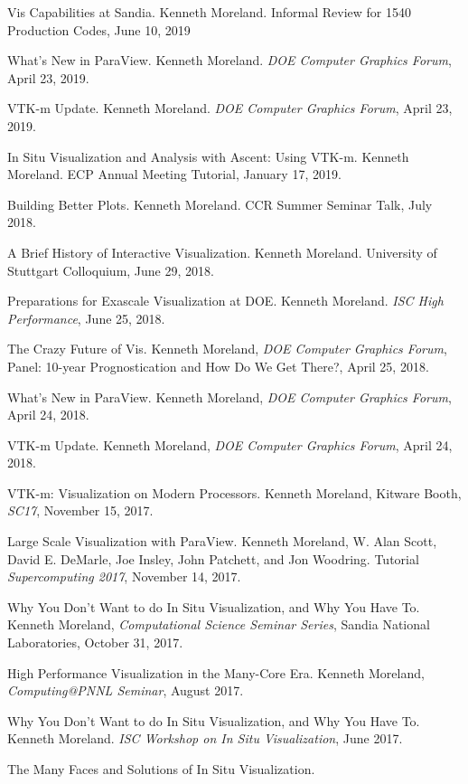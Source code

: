 \documentclass{article}
\begin{document}
\begin{enumerate}[label={[\arabic*]}]
\item Vis Capabilities at Sandia.
  Kenneth Moreland.
  Informal Review for 1540 Production Codes, June 10, 2019
\item What's New in ParaView.
  Kenneth Moreland.
  \emph{DOE Computer Graphics Forum}, April 23, 2019.
\item VTK-m Update.
  Kenneth Moreland.
  \emph{DOE Computer Graphics Forum}, April 23, 2019.
\item In Situ Visualization and Analysis with Ascent: Using VTK-m.
  Kenneth Moreland.
  ECP Annual Meeting Tutorial, January 17, 2019.
\item Building Better Plots.
  Kenneth Moreland.
  CCR Summer Seminar Talk, July 2018.
\item A Brief History of Interactive Visualization.
  Kenneth Moreland.
  University of Stuttgart Colloquium, June 29, 2018.
\item Preparations for Exascale Visualization at DOE.
  Kenneth Moreland.
  \emph{ISC High Performance}, June 25, 2018.
\item The Crazy Future of Vis.
  Kenneth Moreland, \emph{DOE Computer Graphics Forum}, Panel: 10-year Prognostication and How Do We Get There?, April 25, 2018.
\item What's New in ParaView.
  Kenneth Moreland, \emph{DOE Computer Graphics Forum}, April 24, 2018.
\item VTK-m Update.
  Kenneth Moreland, \emph{DOE Computer Graphics Forum}, April 24, 2018.
\item VTK-m: Visualization on Modern Processors.
  Kenneth Moreland, Kitware Booth, \emph{SC17}, November 15, 2017.
\item Large Scale Visualization with ParaView.
  Kenneth Moreland, W. Alan Scott, David E. DeMarle, Joe Insley, John Patchett, and Jon Woodring.
  Tutorial \emph{Supercomputing 2017}, November 14, 2017.
\item Why You Don't Want to do In Situ Visualization, and Why You Have To.
  Kenneth Moreland, \emph{Computational Science Seminar Series}, Sandia National Laboratories, October 31, 2017.
\item High Performance Visualization in the Many-Core Era.
  Kenneth Moreland, \emph{Computing@PNNL Seminar}, August 2017.
\item Why You Don't Want to do In Situ Visualization, and Why You Have To.
  Kenneth Moreland.
  \emph{ISC Workshop on In Situ Visualization}, June 2017.
\item The Many Faces and Solutions of In Situ Visualization.

\end{enumerate}
\end{document}
